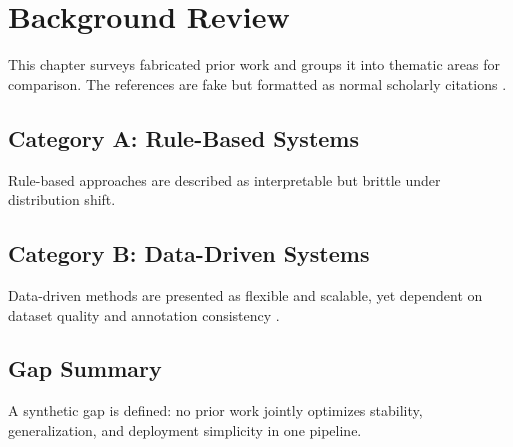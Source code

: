 \chapter{Background Review}
\label{chap:background}

This chapter surveys fabricated prior work and groups it into thematic areas for comparison. The references are fake but formatted as normal scholarly citations \cite{nguyen2023human,lee2021sim}.

\section{Category A: Rule-Based Systems}
Rule-based approaches are described as interpretable but brittle under distribution shift.

\section{Category B: Data-Driven Systems}
Data-driven methods are presented as flexible and scalable, yet dependent on dataset quality and annotation consistency \cite{garcia2020robust}.

\section{Gap Summary}
A synthetic gap is defined: no prior work jointly optimizes stability, generalization, and deployment simplicity in one pipeline.
